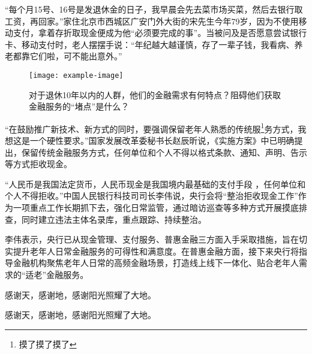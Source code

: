 \documentclass[printMode]{ecnuthesis}
\begin{document}
“每个月15号、16号是发退休金的日子，我早晨会先去菜市场买菜，然后去银行取工资，再回家。”家住北京市西城区广安门外大街的宋先生今年79岁，因为不使用移动支付，拿着存折取现金便成为他“必须要完成的事”。当被问及是否愿意尝试银行卡、移动支付时，老人摆摆手说：“年纪越大越谨慎，存了一辈子钱，我看病、养老都靠它们啦，可不能出意外。”

\begin{figure}
    \centering
    \texttt{[image: example-image]}
    \caption{对于退休10年以内的人群，他们的金融需求有何特点？阻碍他们获取金融服务的“堵点”是什么？}
  \end{figure}

“在鼓励推广新技术、新方式的同时，要强调保留老年人熟悉的传统服\footnote{摸了摸了摸了}务方式，我想这是一个硬性要求。”国家发展改革委秘书长赵辰昕说，《实施方案》中已明确提出，保留传统金融服务方式，任何单位和个人不得以格式条款、通知、声明、告示等方式拒收现金。

“人民币是我国法定货币，人民币现金是我国境内最基础的支付手段 \cite{Yang_Hy200215} ，任何单位和个人不得拒收。”中国人民银行科技司司长李伟说，央行会将“整治拒收现金工作”作为一项重点工作长期抓下去，强化日常监管，通过暗访巡查等多种方式开展摸底排查，同时建立违法主体名录库，重点跟踪、持续整治。

李伟表示，央行已从现金管理、支付服务、普惠金融三方面入手采取措施，旨在切实提升老年人日常金融服务的可得性和满意度。在普惠金融方面，接下来央行将指导金融机构聚焦老年人日常的高频金融场景，打造线上线下一体化、贴合老年人需求的“适老”金融服务。

\backmatter
\PrintReference

\begin{appendix}
  感谢天，感谢地，感谢阳光照耀了大地。
\end{appendix}

\begin{acknowledgement}
  感谢天，感谢地，感谢阳光照耀了大地。
\end{acknowledgement}
\end{document}
